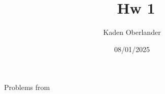 


\title{\textbf{\myclass{\ballocks}\ Hw 1}}
\author{Kaden Oberlander}
\date{08/01/2025}
\newcommand{\ballocks}{Alg}


	\hypersetup{bookmarksnumbered=true,}
	\maketitle
	Problems from \cite{\ballocks}
	
	
\setcounter{equation}{0}	
\begin{problem*}{}{}

\end{problem*}

\setcounter{equation}{0}
\begin{problem*}{}{}

\end{problem*}

\setcounter{equation}{0}
\begin{problem*}{}{}

\end{problem*}

\setcounter{equation}{0}
\begin{problem*}{}{}

\end{problem*}

\setcounter{equation}{0}
\begin{problem*}{}{}
	
\end{problem*}

\setcounter{equation}{0}
\begin{problem*}{}{}
	
\end{problem*}

\setcounter{equation}{0}
\begin{problem*}{}{}
	
\end{problem*}

\setcounter{equation}{0}
\begin{problem*}{}{}
	
\end{problem*}

\setcounter{equation}{0}
\begin{problem*}{}{}
	
\end{problem*}

\setcounter{equation}{0}
\begin{problem*}{}{}
	
\end{problem*}

\setcounter{equation}{0}
\begin{problem*}{}{}
	
\end{problem*}

